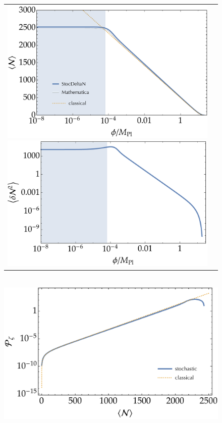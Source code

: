 \documentclass[aps, prd
, preprint
, nofootinbib 
, longbibliography
]{revtex4-1}
\begin{document}
\begin{figure}
	\centering
	\begin{tabular}{cc}
		\begin{minipage}{0.5\hsize}
			\centering
			\includegraphics[width=0.9\hsize]{figs/hilltop/N_conf.pdf}
		\end{minipage}
		\begin{minipage}{0.5\hsize}
			\centering
			\includegraphics[width=0.9\hsize]{figs/hilltop/dN2_conf.pdf}
		\end{minipage}
	\end{tabular} \\[10pt]
	\includegraphics[width=0.5\hsize]{figs/hilltop/Pzeta_conf.pdf}

\end{figure}
\end{document}
